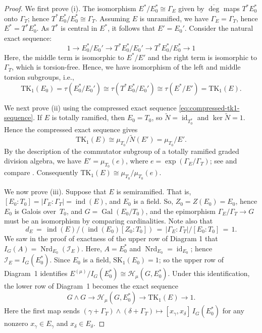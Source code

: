 \documentclass[11pt]{article}
\numberwithin{equation}{section}
\theoremstyle{plain}
\theoremstyle{remark}
\newcommand{\opn}{\operatorname}
\newcommand{\TK}{\opn{TK_1}}
\newcommand{\Nrd}{\opn{Nrd}}
\newcommand{\degg}{\opn{deg}}
\newcommand{\ov}{\overline}
\begin{document}
\begin{proof}
We first prove \textup{(i)}.
The isomorphism $E^*/E_0^* \cong \Gamma_E$  given by $\ov{\degg}$ maps 
$T^*E_0^*$ onto $\Gamma_T$; hence $T^*E_0^*/E_0^* \cong \Gamma_T$.    Assuming $E$ is unramified, we have 
$\Gamma_E = \Gamma_T$, hence $E^* = T^* E_0^*$.  As $T^*$ is central in
$E^*$, it follows that $E' = E_0'$.  Consider the natural exact sequence:
$$
        1\longrightarrow E_0^*/E_0'\longrightarrow T^*E_0^*/E_0'\longrightarrow T^*E_0^*/E_0^* \longrightarrow 1
$$
Here, the middle term is isomorphic to $E^*/E'$ and the right term is isomorphic to $\Gamma_T$, which is 
torsion-free.  Hence, we have isomorphism of the left and middle torsion subgroups, i.e., 
$$
\TK(E_0) =  \tau(E_0^*/E_0') \cong  \tau(T^*E_0^*/E_0') \cong \tau(E^*/E') =  \TK(E).
$$

We next prove \textup{(ii)} using the compressed exact sequence \eqref{eq:compressed-tk1-sequence}. If $E$ is totally 
ramified, then $E_0=T_0$, so $\widetilde N=\operatorname{id}_{T_0^*}$ and $\ker\widetilde N=1$. Hence the 
compressed exact sequence gives
$$
        \mathrm{TK}_1(E)\cong \mu_{T_0}\big / \widetilde N(E')=\mu_{T_0}/E'.
$$
By the description of the commutator subgroup of a totally ramified graded division algebra, we have $E'=\mu_{T_0}(e)$, 
where $e=\exp(\Gamma_E/\Gamma_T)$; see \cite[Prop.~2.1]{hwang-wadsworth-99} and 
compare \cite[Cor.~3.6(ii)]{hazrat-wadsworth-2011}. Consequently $\mathrm{TK}_1(E)\cong\mu_{T_0}/\mu_{T_0}(e)$.

We now prove \textup{(iii)}. Suppose that $E$ is semiramified. That is, 
$[E_0:T_0] = |\Gamma_E:\Gamma_T| = \opn{ind}(E)$, and $E_0$ is a field.  
So, $Z_0 = Z(E_0) = E_0$, hence $E_0$ is Galois over~$T_0$, and $G=\opn{Gal}(E_0/T_0)$, and the epimorphism
$\Gamma_E/\Gamma_T \to G$ must be an isomorphism by comparing cardinalities.  Note also that 
$$
d_E \, = \, \opn{ind}(E) \big/(\opn{ind}(E_0) [Z_0:T_0])  \,=\, |\Gamma_E:\Gamma_T|\big/[E_0:T_0]  \,=\, 1.
$$
We saw in the proof of exactness of the upper row of Diagram 1  that $I_{G}(A) = \Nrd_{E_0}(\mathcal I_E)$.  Here, 
$A = E_0^*$ and  $\Nrd_{E_0}=\opn{id}_{E_0}$; hence $\mathcal I_E=I_{G}(E_0^*)$.
 Since $E_0$ is a field, $\mathrm{SK}_1(E_0)=1$; so the upper row of Diagram~1 identifies 
 $E^{(\mu)}/I_{G}(E_0^*)\cong \mathcal H_\mu(G,E_0^*)$.
Under this identification, the lower row of Diagram~1 becomes the exact sequence
\begin{equation}
\label{SESforH_mu}
        G\wedge G
        \longrightarrow
        \mathcal H_\mu(G,E_0^*)
        \longrightarrow
        \mathrm{TK}_1(E)
        \longrightarrow 1.
\end{equation}
Here the first map sends 
$(\gamma+\Gamma_T)\wedge(\delta+\Gamma_T) \longmapsto [x_\gamma,x_\delta]\,I_{G}(E_0^*)$ for any nonzero 
$x_\gamma\in E_\gamma$ and $x_\delta \in E_\delta$.


\end{proof}
\end{document}
